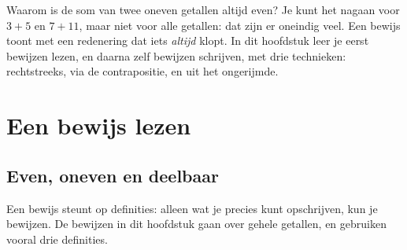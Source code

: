 %



Waarom is de som van twee oneven getallen altijd even? Je kunt het nagaan voor $3 + 5$ en $7 + 11$, maar niet voor alle getallen: dat zijn er oneindig veel. Een bewijs toont met een redenering dat iets \textit{altijd} klopt. In dit hoofdstuk leer je eerst bewijzen lezen, en daarna zelf bewijzen schrijven, met drie technieken: rechtstreeks, via de contrapositie, en uit het ongerijmde.

\begin{oefeningen}[Start]

\end{oefeningen}

\section{Een bewijs lezen}\label{sec:h2-lezen}

\subsection{Even, oneven en deelbaar}

Een bewijs steunt op definities: alleen wat je precies kunt opschrijven, kun je bewijzen. De bewijzen in dit hoofdstuk gaan over gehele getallen, en gebruiken vooral drie definities.

